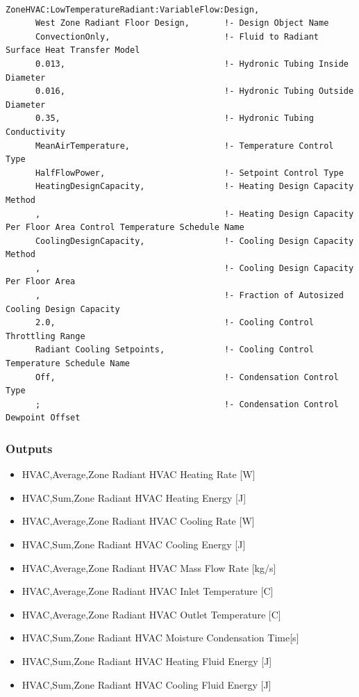 \begin{lstlisting}

ZoneHVAC:LowTemperatureRadiant:VariableFlow:Design,
      West Zone Radiant Floor Design,       !- Design Object Name
      ConvectionOnly,                       !- Fluid to Radiant Surface Heat Transfer Model
      0.013,                                !- Hydronic Tubing Inside Diameter
      0.016,                                !- Hydronic Tubing Outside Diameter
      0.35,                                 !- Hydronic Tubing Conductivity
      MeanAirTemperature,                   !- Temperature Control Type
      HalfFlowPower,                        !- Setpoint Control Type
      HeatingDesignCapacity,                !- Heating Design Capacity Method
      ,                                     !- Heating Design Capacity Per Floor Area Control Temperature Schedule Name
      CoolingDesignCapacity,                !- Cooling Design Capacity Method
      ,                                     !- Cooling Design Capacity Per Floor Area
      ,                                     !- Fraction of Autosized Cooling Design Capacity
      2.0,                                  !- Cooling Control Throttling Range
      Radiant Cooling Setpoints,            !- Cooling Control Temperature Schedule Name
      Off,                                  !- Condensation Control Type
      ;                                     !- Condensation Control Dewpoint Offset
\end{lstlisting}

\subsubsection{Outputs}\label{outputs-5-007}

\begin{itemize}
\item
  HVAC,Average,Zone Radiant HVAC Heating Rate {[}W{]}
\item
  HVAC,Sum,Zone Radiant HVAC Heating Energy {[}J{]}
\item
  HVAC,Average,Zone Radiant HVAC Cooling Rate {[}W{]}
\item
  HVAC,Sum,Zone Radiant HVAC Cooling Energy {[}J{]}
\item
  HVAC,Average,Zone Radiant HVAC Mass Flow Rate {[}kg/s{]}
\item
  HVAC,Average,Zone Radiant HVAC Inlet Temperature {[}C{]}
\item
  HVAC,Average,Zone Radiant HVAC Outlet Temperature {[}C{]}
\item
  HVAC,Sum,Zone Radiant HVAC Moisture Condensation Time{[}s{]}
\item
  HVAC,Sum,Zone Radiant HVAC Heating Fluid Energy {[}J{]}
\item
  HVAC,Sum,Zone Radiant HVAC Cooling Fluid Energy {[}J{]}
\end{itemize}


